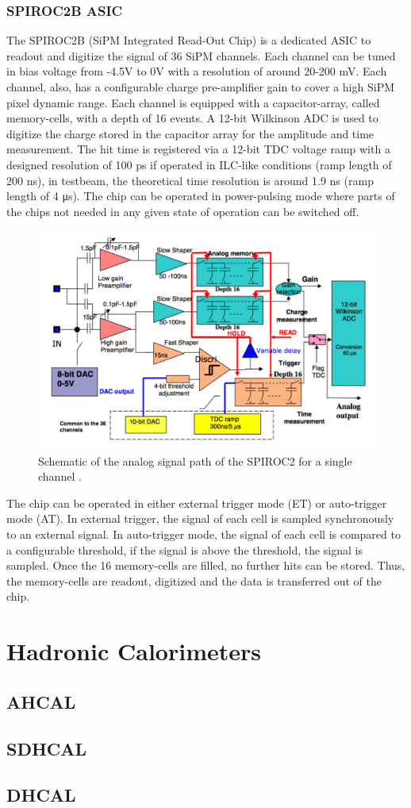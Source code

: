 \subsubsection{SPIROC2B ASIC}

The SPIROC2B (SiPM Integrated Read-Out Chip) is a dedicated ASIC to readout and digitize the signal of 36 SiPM channels. Each channel can be tuned in bias voltage from -4.5V to 0V with a resolution of around 20-200 mV. Each channel, also, has a configurable charge pre-amplifier gain to cover a high SiPM pixel dynamic range. Each channel is equipped with a capacitor-array, called memory-cells, with a depth of 16 events. A 12-bit Wilkinson ADC is used to digitize the charge stored in the capacitor array for the amplitude and time measurement. The hit time is registered via a 12-bit TDC voltage ramp with a designed resolution of 100 ps if operated in ILC-like conditions (ramp length of 200 \si{\nano\second}), in testbeam, the theoretical time resolution is around 1.9 ns (ramp length of 4 \si{\micro\second}). The chip can be operated in power-pulsing mode where parts of the chips not needed in any given state of operation can be switched off.

\begin{figure}[htbp!]
  \centering
  \includegraphics[width=0.7\linewidth]{chap3/fig/SPIROC2B_schematic.png}
  \caption{Schematic of the analog signal path of the SPIROC2 for a single channel \cite{SPIROC2_datasheet}.} \label{fig:SPIROC2B_sche}
\end{figure}

The chip can be operated in either external trigger mode (ET) or auto-trigger mode (AT). In external trigger, the signal of each cell is sampled synchronously to an external signal. In auto-trigger mode, the signal of each cell is compared to a configurable threshold, if the signal is above the threshold, the signal is sampled. Once the 16 memory-cells are filled, no further hits can be stored. Thus, the memory-cells are readout, digitized and the data is transferred out of the chip.

\section{Hadronic Calorimeters}

\subsection{AHCAL}
\label{subsec:SPIROC2B}

\subsection{SDHCAL}
\subsection{DHCAL}
